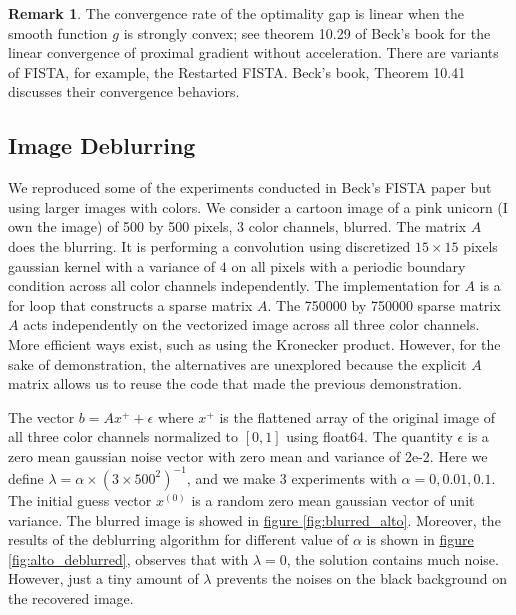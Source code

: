 \documentclass[]{article}
\theoremstyle{definition}
\newtheorem{remark}{Remark}[subsection]
{
    \newtheorem{assumption}{Assumption}
}
\begin{document}
        \begin{remark}
            The convergence rate of the optimality gap is linear when the smooth function $g$ is strongly convex; see theorem 10.29 of Beck's book\cite{book:first_order_opt} for the linear convergence of proximal gradient without acceleration. There are variants of FISTA, for example, the Restarted FISTA. Beck's book, Theorem 10.41 \cite{book:first_order_opt} discusses their convergence behaviors.
        \end{remark}
        
    \subsection*{Image Deblurring}
        We reproduced some of the experiments conducted in Beck's FISTA paper \cite{paper:FISTA} but using larger images with colors. We consider a cartoon image of a pink unicorn (I own the image) of 500 by 500 pixels, 3 color channels, blurred. The matrix $A$ does the blurring. It is performing a convolution using discretized $15\times 15$ pixels gaussian kernel with a variance of $4$ on all pixels with a periodic boundary condition across all color channels independently. The implementation for $A$ is a for loop that constructs a sparse matrix $A$. The 750000 by 750000 sparse matrix $A$ acts independently on the vectorized image across all three color channels. More efficient ways exist, such as using the Kronecker product. However, for the sake of demonstration, the alternatives are unexplored because the explicit $A$ matrix allows us to reuse the code that made the previous demonstration. 
        \par
        The vector $b = Ax^+ + \epsilon$ where $x^+$ is the flattened array of the original image of all three color channels normalized to $[0, 1]$ using float64. The quantity $\epsilon$ is a zero mean gaussian noise vector with zero mean and variance of 2e-2. Here we define $\lambda = \alpha\times (3\times500^2)^{-1}$, and we make 3 experiments with $\alpha = 0, 0.01, 0.1$. The initial guess vector $x^{(0)}$ is a random zero mean gaussian vector of unit variance. The blurred image is showed in \hyperref[fig:blurred_alto]{figure \ref*{fig:blurred_alto}}. Moreover, the results of the deblurring algorithm for different value of $\alpha$ is shown in \hyperref[fig:alto_deblurred]{figure \ref*{fig:alto_deblurred}}, observes that with $\lambda = 0$, the solution contains much noise. However, just a tiny amount of $\lambda$ prevents the noises on the black background on the recovered image. 
\end{document}
